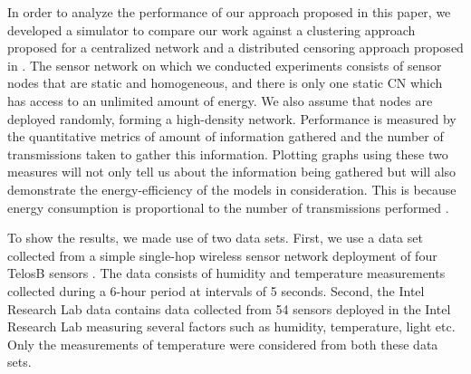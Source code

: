 In order to analyze the performance of our approach proposed in this
paper, we developed a simulator to compare our work against a
clustering approach proposed for a centralized network
\cite{muruganathan2005centralized} and a distributed censoring
approach proposed in \cite{rago1996censoring}.  The sensor network on
which we conducted experiments consists of sensor nodes that are
static and homogeneous, and there is only one static CN which has
access to an unlimited amount of energy. We also assume that nodes are
deployed randomly, forming a high-density network. Performance is
measured by the quantitative metrics of amount of information gathered
and the number of transmissions taken to gather this
information. Plotting graphs using these two measures will not only
tell us about the information being gathered but will also demonstrate
the energy-efficiency of the models in consideration. This is because
energy consumption is proportional to the number of transmissions
performed \cite{torres2006energy}.

To show the results, we made use of two data sets.  First, we use a
data set collected from a simple single-hop wireless sensor network
deployment of four TelosB sensors \cite{suthaharan2010labelled}. The
data consists of humidity and temperature measurements collected
during a 6-hour period at intervals of 5 seconds. Second, the Intel
Research Lab data \cite{BodikGuestrinEtAl2004} contains data collected
from 54 sensors deployed in the Intel Research Lab measuring several
factors such as humidity, temperature, light etc.  Only the
measurements of temperature were considered from both these data sets.

